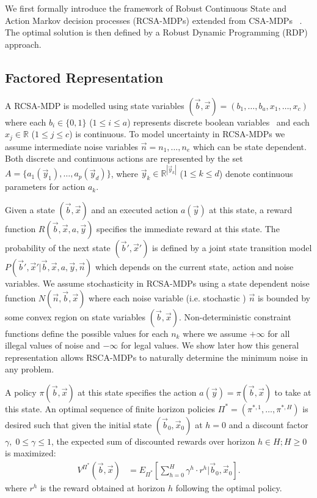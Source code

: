 We first formally introduce the framework of Robust Continuous State and Action Markov decision processes (RCSA-MDPs) extended from CSA-MDPs ~\cite{sdp_aaai}. The optimal solution is then defined by a Robust Dynamic Programming (RDP) approach. 
\subsection{Factored Representation}

A RCSA-MDP is modelled using state variables $(\vec{b},\vec{x}) = ( b_1,\ldots,b_a,x_{1},\ldots,x_c )$ where each $b_i \in \{ 0,1 \}$ ($1 \leq i \leq a$) represents discrete boolean variables $\,$
and each $x_j \in \mathbb{R}$ ($1 \leq j \leq c$) is continuous.  To model uncertainty in RCSA-MDPs we assume intermediate noise variables $\vec{n} = n_1, \ldots , n_e$ which can be state dependent. 
Both discrete and continuous actions are represented by the set $A = \{a_1(\vec{y}_1), \ldots, a_p(\vec{y}_d) \}$, where  $\vec{y}_k \in \mathbb{R}^{|\vec{y}_k|}$ ($1\leq k \leq d$) denote continuous parameters for action $a_k$. 

Given a state $(\vec{b},\vec{x})$ and an executed action $a(\vec{y})$ at this state, a
reward function $R(\vec{b},\vec{x},a,\vec{y})$ specifies the immediate reward at this state. The probability of the next state $(\vec{b}',\vec{x}')$ is defined by a joint state transition model $P(\vec{b}',\vec{x}'| \vec{b},\vec{x},a,\vec{y},\vec{n})$ which depends on the current state, action and noise variables. We assume stochasticity in RCSA-MDPs using a state dependent noise function $N(\vec{n},\vec{b},\vec{x})$ where each noise variable (i.e. stochastic ) $\vec{n}$ is bounded by some convex region on state variables $(\vec{b},\vec{x})$. Non-deterministic constraint functions define the possible values for each $n_k$ where we assume $+\infty$ for all illegal values of noise and $-\infty$ for legal values. We show later how this general representation allows RSCA-MDPs to naturally determine the minimum noise in any problem. 

A policy $\pi(\vec{b},\vec{x})$ at this state specifies the action $a(\vec{y}) =
\pi(\vec{b},\vec{x})$ to take at this state.  An optimal sequence of finite horizon policies $\Pi^* = (\pi^{*,1},\ldots,\pi^{*,H})$ is desired such that given the initial state $(\vec{b}_0,\vec{x}_0)$ at $h=0$ and  a discount factor $\gamma, \; 0 \leq \gamma \leq 1$, the expected sum of discounted rewards over horizon $h \in H ;H \geq 0$ is maximized: 
\begin{align}
V^{\Pi^*}(\vec{b},\vec{x}) & = E_{\Pi^*} \left[ \sum_{h=0}^{H} \gamma^h \cdot r^h \Big| \vec{b}_0,\vec{x}_0\right].
\end{align}
where $r^h$ is the reward obtained at horizon $h$ following the optimal policy. 

